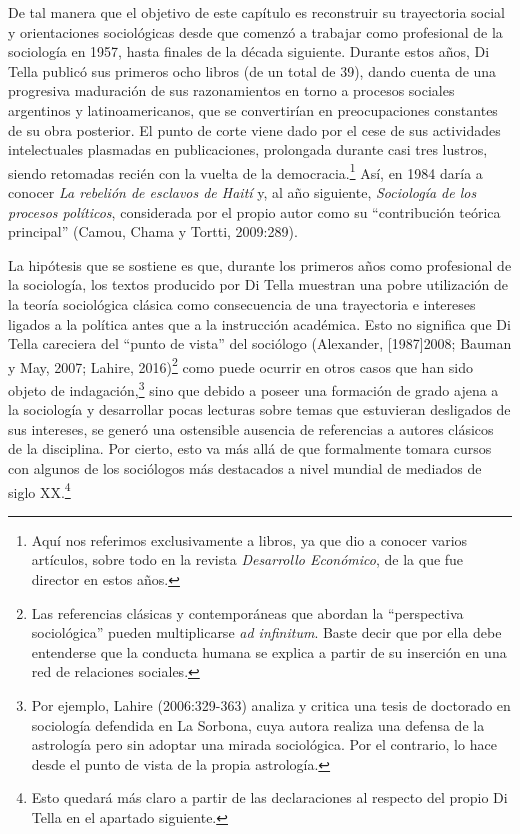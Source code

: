 De tal manera que el objetivo de este capítulo es reconstruir su trayectoria social y orientaciones sociológicas desde que comenzó a trabajar como profesional de la sociología en 1957, hasta finales de la década siguiente. Durante estos años, Di Tella publicó sus primeros ocho libros (de un total de 39), dando cuenta de una progresiva maduración de sus razonamientos en torno a procesos sociales argentinos y latinoamericanos, que se convertirían en preocupaciones constantes de su obra posterior. El punto de corte viene dado por el cese de sus actividades intelectuales plasmadas en publicaciones, prolongada durante casi tres lustros, siendo retomadas recién con la vuelta de la democracia.\footnote{Aquí nos referimos exclusivamente a libros, ya que dio a conocer varios artículos, sobre todo en la revista \emph{Desarrollo Económico}, de la que fue director en estos años.} Así, en 1984 daría a conocer \emph{La rebelión de esclavos de Haití} y, al año siguiente, \emph{Sociología de los procesos políticos}, considerada por el propio autor como su ``contribución teórica principal'' (Camou, Chama y Tortti, 2009:289).

La hipótesis que se sostiene es que, durante los primeros años como profesional de la sociología, los textos producido por Di Tella muestran una pobre utilización de la teoría sociológica clásica como consecuencia de una trayectoria e intereses ligados a la política antes que a la instrucción académica. Esto no significa que Di Tella careciera del ``punto de vista'' del sociólogo (Alexander, {[}1987{]}2008; Bauman y May, 2007; Lahire, 2016)\footnote{Las referencias clásicas y contemporáneas que abordan la ``perspectiva sociológica'' pueden multiplicarse \emph{ad infinitum}. Baste decir que por ella debe entenderse que la conducta humana se explica a partir de su inserción en una red de relaciones sociales.} como puede ocurrir en otros casos que han sido objeto de indagación,\footnote{Por ejemplo, Lahire (2006:329-363) analiza y critica una tesis de doctorado en sociología defendida en La Sorbona, cuya autora realiza una defensa de la astrología pero sin adoptar una mirada sociológica. Por el contrario, lo hace desde el punto de vista de la propia astrología.} sino que debido a poseer una formación de grado ajena a la sociología y desarrollar pocas lecturas sobre temas que estuvieran desligados de sus intereses, se generó una ostensible ausencia de referencias a autores clásicos de la disciplina. Por cierto, esto va más allá de que formalmente tomara cursos con algunos de los sociólogos más destacados a nivel mundial de mediados de siglo XX.\footnote{Esto quedará más claro a partir de las declaraciones al respecto del propio Di Tella en el apartado siguiente.}

